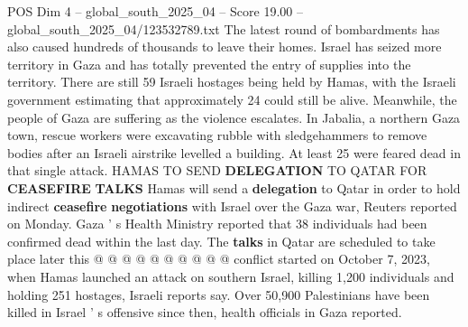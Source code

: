 \begin{textsample}{POS Dim 4 – global\_south\_2025\_04 – Score 19.00 – global\_south\_2025\_04/123532789.txt}
The latest round of bombardments has also caused hundreds of thousands to leave their homes.
Israel has seized more territory in Gaza and has totally prevented the entry of supplies into the territory.
There are still 59 Israeli hostages being held by Hamas, with the Israeli government estimating that approximately 24 could still be alive.
Meanwhile, the people of Gaza are suffering as the violence escalates.
In Jabalia, a northern Gaza town, rescue workers were excavating rubble with sledgehammers to remove bodies after an Israeli airstrike levelled a building.
At least 25 were feared dead in that single attack.
HAMAS TO SEND \textbf{DELEGATION} TO QATAR FOR \textbf{CEASEFIRE} \textbf{TALKS} Hamas will send a \textbf{delegation} to Qatar in order to hold indirect \textbf{ceasefire} \textbf{negotiations} with Israel over the Gaza war, Reuters reported on Monday.
Gaza ' s Health Ministry reported that 38 individuals had been confirmed dead within the last day.
The \textbf{talks} in Qatar are scheduled to take place later this @ @ @ @ @ @ @ @ @ @ conflict started on October 7, 2023, when Hamas launched an attack on southern Israel, killing 1,200 individuals and holding 251 hostages, Israeli reports say.
Over 50,900 Palestinians have been killed in Israel ' s offensive since then, health officials in Gaza reported.

\end{textsample}
